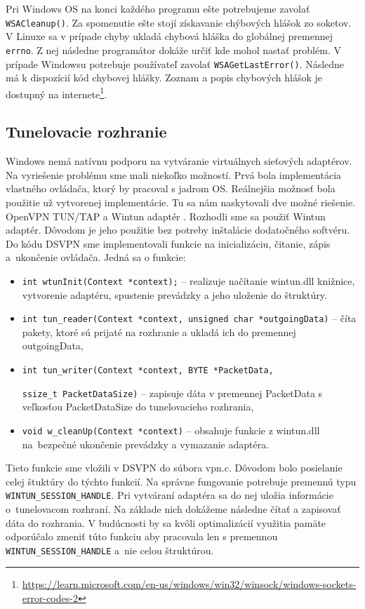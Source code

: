 Pri Windows OS na konci každého programu ešte potrebujeme zavolať \\\lstinline|WSACleanup()|. Za spomenutie ešte stojí získavanie chýbových hlášok zo soketov. V Linuxe sa v prípade chyby ukladá chybová hláška do globálnej premennej  \lstinline|errno|. Z nej následne programátor dokáže určiť kde mohol nastať problém. V prípade Windowsu potrebuje používateľ zavolať \lstinline|WSAGetLastError()|. Následne má k dispozícií kód chybovej hlášky. Zoznam a popis chybových hlášok je dostupný na internete\footnote{\url{https://learn.microsoft.com/en-us/windows/win32/winsock/windows-sockets-error-codes-2}}.  
\subsection{Tunelovacie rozhranie}
Windows nemá natívnu podporu na vytváranie virtuálnych sieťových adaptérov. Na vyriešenie problému sme mali niekoľko možností. Prvá bola implementácia vlastného ovládača, ktorý by pracoval s jadrom OS. Reálnejšia možnosť bola použitie už vytvorenej implementácie. Tu sa nám naskytovali dve možné riešenie. OpenVPN TUN/TAP a Wintun adaptér \cite{wintun}. Rozhodli sme sa použiť Wintun adaptér. Dôvodom je jeho použitie bez potreby inštalácie dodatočného softvéru. 
Do kódu DSVPN sme implementovali funkcie na inicializáciu, čitanie, zápis a~ukončenie ovládača. Jedná sa o funkcie: 
\begin{itemize}
	\item\lstinline|int wtunInit(Context *context);| -- realizuje načítanie wintun.dll knižnice, vytvorenie adaptéru, spustenie prevádzky a jeho uloženie do štruktúry.
	\item\lstinline|int tun_reader(Context *context, unsigned char *outgoingData)| -- číta pakety, ktoré sú prijaté na rozhranie a ukladá ich do premennej outgoingData,
	\item\lstinline|int tun_writer(Context *context, BYTE *PacketData,| 
	
		\lstinline|ssize_t PacketDataSize)| -- zapisuje dáta v premennej PacketData s veľkosťou PacketDataSize do tunelovacieho rozhrania,
	\item\lstinline|void w_cleanUp(Context *context)| -- obsahuje funkcie z wintun.dll na~bezpečné ukončenie prevádzky a vymazanie adaptéra.
\end{itemize} 

Tieto funkcie sme vložili v DSVPN do súbora vpn.c. Dôvodom bolo posielanie celej štuktúry do týchto funkcií. Na správne fungovanie potrebuje premennú typu \lstinline|WINTUN_SESSION_HANDLE|. Pri vytváraní adaptéra sa do nej uložia informácie o~tunelovacom rozhraní. Na základe nich dokážeme následne čítať a zapisovať dáta do rozhrania. V budúcnosti by sa kvôli optimalizácií využitia pamäte odporúčalo zmeniť túto funkciu aby pracovala len s premennou \lstinline|WINTUN_SESSION_HANDLE| a~nie celou štruktúrou.

